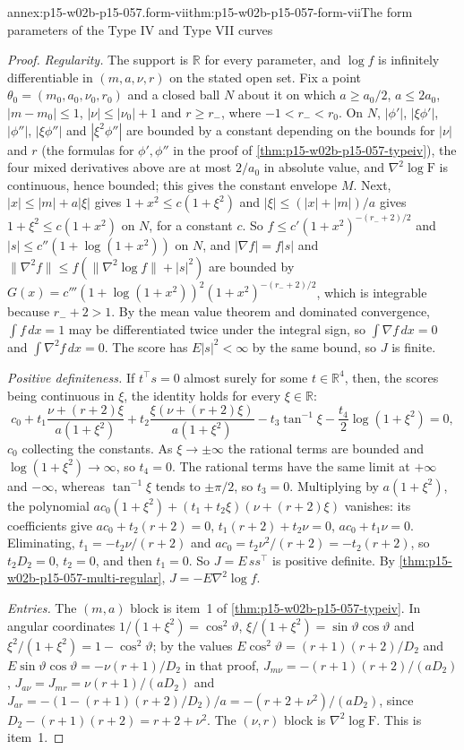 \begin{annexitem}{annex:p15-w02b-p15-057.form-vii}{thm:p15-w02b-p15-057-form-vii}{The form parameters of the Type IV and Type VII curves}
\begin{proof}
\emph{Regularity.} The support is \(\mathbb R\) for every parameter, and
\(\log f\) is infinitely differentiable in \((m,a,\nu,r)\) on the stated
open set. Fix a point \(\theta_0=(m_0,a_0,\nu_0,r_0)\) and a closed ball
\(N\) about it on which \(a\geq a_0/2\), \(a\leq2a_0\), \(|m-m_0|\leq1\),
\(|\nu|\leq|\nu_0|+1\) and \(r\geq r_-\), where \(-1<r_-<r_0\). On \(N\),
\(|\phi'|\), \(|\xi\phi'|\), \(|\phi''|\), \(|\xi\phi''|\) and
\(|\xi^2\phi''|\) are bounded by a constant depending on the bounds for
\(|\nu|\) and \(r\) (the formulas for \(\phi',\phi''\) in the proof of
\cref{thm:p15-w02b-p15-057-typeiv}), the four mixed derivatives above are
at most \(2/a_0\) in absolute value, and \(\nabla^2\log\mathrm F\) is
continuous, hence bounded; this gives the constant envelope \(M\). Next,
\(|x|\leq|m|+a|\xi|\) gives \(1+x^2\leq c(1+\xi^2)\) and
\(|\xi|\leq(|x|+|m|)/a\) gives \(1+\xi^2\leq c(1+x^2)\) on \(N\), for a
constant \(c\). So \(f\leq c'(1+x^2)^{-(r_-+2)/2}\) and
\(|s|\leq c''(1+\log(1+x^2))\) on \(N\), and \(|\nabla f|=f|s|\) and
\(\|\nabla^2f\|\leq f(\|\nabla^2\log f\|+|s|^2)\) are bounded by
\(G(x)=c'''(1+\log(1+x^2))^2(1+x^2)^{-(r_-+2)/2}\), which is integrable
because \(r_-+2>1\). By the mean value theorem and dominated convergence,
\(\int f\,dx=1\) may be differentiated twice under the integral sign, so
\(\int\nabla f\,dx=0\) and \(\int\nabla^2f\,dx=0\). The score has
\(E|s|^2<\infty\) by the same bound, so \(J\) is finite.

\emph{Positive definiteness.} If \(t^{\top}s=0\) almost surely for some
\(t\in\mathbb R^4\), then, the scores being continuous in \(\xi\), the
identity holds for every \(\xi\in\mathbb R\):
\[
 c_0+t_1\frac{\nu+(r+2)\xi}{a(1+\xi^2)}
 +t_2\frac{\xi(\nu+(r+2)\xi)}{a(1+\xi^2)}
 -t_3\tan^{-1}\xi-\frac{t_4}2\log(1+\xi^2)=0,
\]
\(c_0\) collecting the constants. As \(\xi\to\pm\infty\) the rational terms
are bounded and \(\log(1+\xi^2)\to\infty\), so \(t_4=0\). The rational
terms have the same limit at \(+\infty\) and \(-\infty\), whereas
\(\tan^{-1}\xi\) tends to \(\pm\pi/2\), so \(t_3=0\). Multiplying by
\(a(1+\xi^2)\), the polynomial \(ac_0(1+\xi^2)+(t_1+t_2\xi)(\nu+(r+2)\xi)\)
vanishes: its coefficients give \(ac_0+t_2(r+2)=0\),
\(t_1(r+2)+t_2\nu=0\), \(ac_0+t_1\nu=0\). Eliminating, \(t_1=-t_2\nu/(r+2)\)
and \(ac_0=t_2\nu^2/(r+2)=-t_2(r+2)\), so \(t_2D_2=0\), \(t_2=0\), and then
\(t_1=0\). So \(J=E\,ss^{\top}\) is positive definite. By
\cref{thm:p15-w02b-p15-057-multi-regular}, \(J=-E\nabla^2\log f\).

\emph{Entries.} The \((m,a)\) block is item~1 of
\cref{thm:p15-w02b-p15-057-typeiv}. In angular coordinates
\(1/(1+\xi^2)=\cos^2\vartheta\), \(\xi/(1+\xi^2)=\sin\vartheta\cos
\vartheta\) and \(\xi^2/(1+\xi^2)=1-\cos^2\vartheta\); by the values
\(E\cos^2\vartheta=(r+1)(r+2)/D_2\) and
\(E\sin\vartheta\cos\vartheta=-\nu(r+1)/D_2\) in that proof,
\(J_{m\nu}=-(r+1)(r+2)/(aD_2)\), \(J_{a\nu}=J_{mr}=\nu(r+1)/(aD_2)\) and
\(J_{ar}=-(1-(r+1)(r+2)/D_2)/a=-(r+2+\nu^2)/(aD_2)\), since
\(D_2-(r+1)(r+2)=r+2+\nu^2\). The \((\nu,r)\) block is
\(\nabla^2\log\mathrm F\). This is item~1.


\end{proof}
\end{annexitem}
